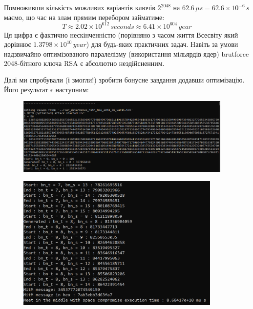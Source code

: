 Помноживши кількість можливих варіантів ключів $2^{2048}$ на $62.6 \, \mu s = 62.6 \times 10^{-6} \, s$ маємо, що час на 
злам прямим перебором займатиме:
\begin{equation*}
    T \approx 2.02 \times 10^{612} \, seconds \approx 6.41 \times 10^{604} \, year
\end{equation*}
Ця цифра є фактично нескінченністю (порівняно з часом життя Всесвіту який дорівнює $1.3798 \times 10^{10} \, year$) для 
будь-яких практичних задач. Навіть за умови надзвичайно оптимізованого паралелізму (використання мільярдів ядер) 
brutforce 2048-бітного ключа RSA є абсолютно нездійсненним.

Далі ми спробували (і змогли!) зробити бонусне завдання додавши оптимізацію. Його результат є наступним:

\begin{figure}[!ht]
    \centering
    \begin{minipage}{0.95\linewidth}
        \includegraphics[width=0.95\textwidth, scale=1.5]{ReportPic/report_7_MitM_bonus.png}
    \end{minipage}
\end{figure}

\begin{figure}[!ht]
    \centering
    \begin{minipage}{0.9\linewidth}
        \includegraphics[width=0.90\textwidth, scale=1.2]{ReportPic/report_8_MitM_bonus.png}
    \end{minipage}
\end{figure}

